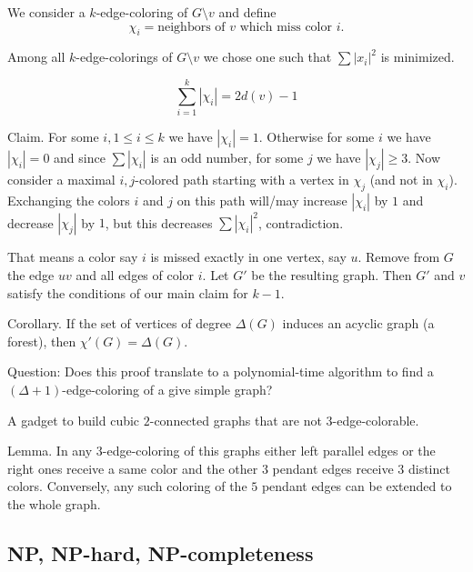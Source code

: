 \documentclass[12pt,a4paper]{article} \usepackage{fontspec}
\begin{document}
We consider a \(k\)-edge-coloring of \(G \setminus v\) and define \[\chi_i =
{\text{neighbors of } v \text{ which miss color } i}.\]

Among all \(k\)-edge-colorings of \(G\setminus v\) we chose one such that
\(\sum{|x_i|}^2\) is minimized.

\[\sum_{i=1}^k|\chi_i| = 2d(v)-1\]

Claim. For some \(i, 1 \leq i \leq k\) we have \(|\chi_i| = 1\). Otherwise for
some \(i\) we have \(|\chi_i| = 0\) and since \(\sum|\chi_i|\) is an odd number,
for some \(j\) we have \(|\chi_j| \geq 3\). Now consider a maximal \({i,
j}\)-colored path starting with a vertex in \(\chi_j\) (and not in \(\chi_i\)).
Exchanging the colors \(i\) and \(j\) on this path will/may increase
\(|\chi_i|\) by \(1\) and decrease \(|\chi_j|\) by \(1\), but this decreases
\(\sum{|\chi_i|}^2\), contradiction.

That means a color say \(i\) is missed exactly in one vertex, say \(u\). Remove
from \(G\) the edge \(u v\) and all edges of color \(i\). Let \(G'\) be the
resulting graph. Then \(G'\) and \(v\) satisfy the conditions of our main claim
for \(k-1\).

Corollary. If the set of vertices of degree \(\Delta(G)\) induces an acyclic
graph (a forest), then \(\chi'(G) = \Delta(G)\).

Question: Does this proof translate to a polynomial-time algorithm to find a
\((\Delta + 1)\)-edge-coloring of a give simple graph?

A gadget to build cubic \(2\)-connected graphs that are not
\(3\)-edge-colorable.

\begin{center}  \end{center}

Lemma. In any \(3\)-edge-coloring of this graphs either left parallel edges or
the right ones receive a same color and the other \(3\) pendant edges receive
\(3\) distinct colors. Conversely, any such coloring of the \(5\) pendant edges
can be extended to the whole graph.

\subsection{NP, NP-hard, NP-completeness}
\end{document}
